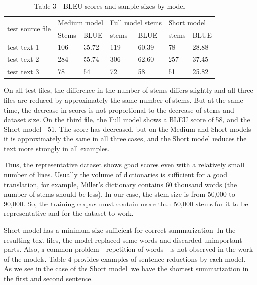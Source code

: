 \begin{table}[H]
\caption*{Table 3 - BLEU scores and sample sizes by model}
\centering
\begin{tabular}{|l|ll|ll|ll|}
\hline
\multirow{2}{*}{test source file} & \multicolumn{2}{l|}{Medium model} & \multicolumn{2}{l|}{Full model stems} & \multicolumn{2}{l|}{Short model} \\ \cline{2-7}
 & \multicolumn{1}{l|}{Stems} & BLUE & \multicolumn{1}{l|}{stems} & BLUE & \multicolumn{1}{l|}{stems} & BLUE \\ \hline
test text 1 & \multicolumn{1}{l|}{106} & 35.72 & \multicolumn{1}{l|}{119} & 60.39 & \multicolumn{1}{l|}{78} & 28.88 \\ \hline
test text 2 & \multicolumn{1}{l|}{284} & 55.74 & \multicolumn{1}{l|}{306} & 62.60 & \multicolumn{1}{l|}{257} & 37.45 \\ \hline
test text 3 & \multicolumn{1}{l|}{78} & 54 & \multicolumn{1}{l|}{72} & 58 & \multicolumn{1}{l|}{51} & 25.82 \\ \hline
\end{tabular}
\end{table}

On all test files, the difference in the number of stems differs
slightly and all three files are reduced by approximately the same
number of stems. But at the same time, the decrease in scores is not
proportional to the decrease of stems and dataset size. On the third
file, the Full model shows a BLEU score of 58, and the Short model - 51.
The score has decreased, but on the Medium and Short models it is
approximately the same in all three cases, and the Short model reduces
the text more strongly in all examples.

Thus, the representative dataset shows good scores even with a
relatively small number of lines. Usually the volume of dictionaries is
sufficient for a good translation, for example, Miller's dictionary
contains 60 thousand words (the number of stems should be less). In our
case, the stem size is from 50,000 to 90,000. So, the training corpus
must contain more than 50,000 stems for it to be representative and for
the dataset to work.

Short model has a minimum size sufficient for correct summarization. In
the resulting text files, the model replaced some words and discarded
unimportant parts. Also, a common problem - repetition of words - is not
observed in the work of the models. Table 4 provides examples of
sentence reductions by each model. As we see in the case of the Short
model, we have the shortest summarization in the first and second
sentence.

